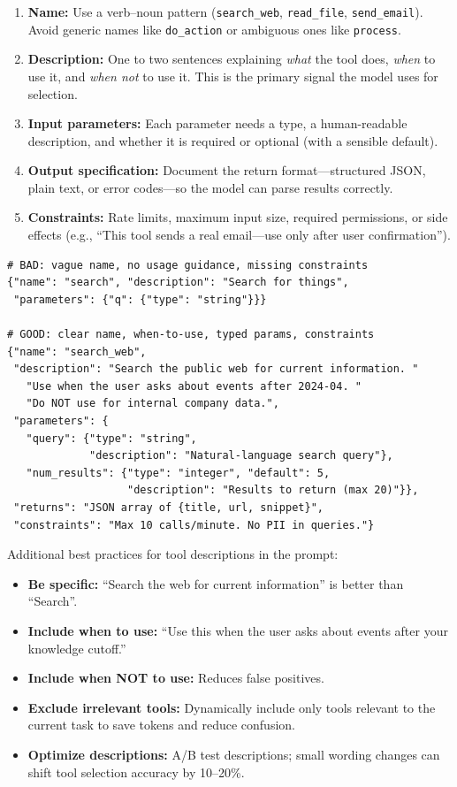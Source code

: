 \begin{enumerate}
  \item \textbf{Name:} Use a verb--noun pattern (\texttt{search\_web}, \texttt{read\_file}, \texttt{send\_email}). Avoid generic names like \texttt{do\_action} or ambiguous ones like \texttt{process}.
  \item \textbf{Description:} One to two sentences explaining \emph{what} the tool does, \emph{when} to use it, and \emph{when not} to use it. This is the primary signal the model uses for selection.
  \item \textbf{Input parameters:} Each parameter needs a type, a human-readable description, and whether it is required or optional (with a sensible default).
  \item \textbf{Output specification:} Document the return format---structured JSON, plain text, or error codes---so the model can parse results correctly.
  \item \textbf{Constraints:} Rate limits, maximum input size, required permissions, or side effects (e.g., ``This tool sends a real email---use only after user confirmation'').
\end{enumerate}

\begin{examplebox}
\begin{lstlisting}[style=pythonstyle]
# BAD: vague name, no usage guidance, missing constraints
{"name": "search", "description": "Search for things",
 "parameters": {"q": {"type": "string"}}}

# GOOD: clear name, when-to-use, typed params, constraints
{"name": "search_web",
 "description": "Search the public web for current information. "
   "Use when the user asks about events after 2024-04. "
   "Do NOT use for internal company data.",
 "parameters": {
   "query": {"type": "string",
             "description": "Natural-language search query"},
   "num_results": {"type": "integer", "default": 5,
                   "description": "Results to return (max 20)"}},
 "returns": "JSON array of {title, url, snippet}",
 "constraints": "Max 10 calls/minute. No PII in queries."}
\end{lstlisting}
\end{examplebox}

Additional best practices for tool descriptions in the prompt:

\begin{itemize}
  \item \textbf{Be specific:} ``Search the web for current information'' is better than ``Search''.
  \item \textbf{Include when to use:} ``Use this when the user asks about events after your knowledge cutoff.''
  \item \textbf{Include when NOT to use:} Reduces false positives.
  \item \textbf{Exclude irrelevant tools:} Dynamically include only tools relevant to the current task to save tokens and reduce confusion.
  \item \textbf{Optimize descriptions:} A/B test descriptions; small wording changes can shift tool selection accuracy by 10--20\%.
\end{itemize}

